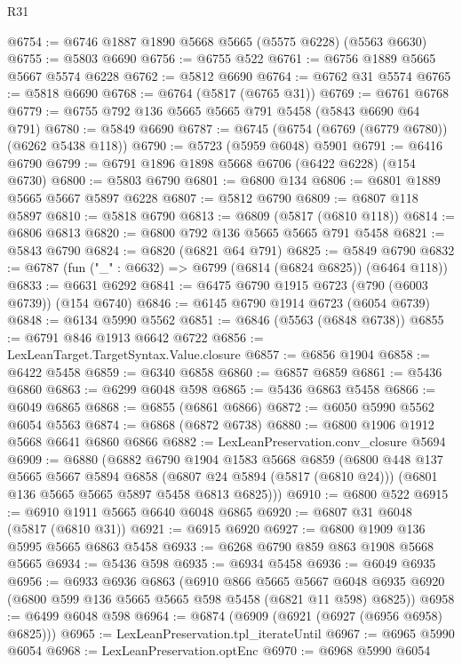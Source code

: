 \begin{lexlean}{R31}
\begin{coremodule}
@6754 := @6746 @1887 @1890 @5668 @5665 (@5575 @6228) (@5563 @6630)
@6755 := @5803 @6690
@6756 := @6755 @522
@6761 := @6756 @1889 @5665 @5667 @5574 @6228
@6762 := @5812 @6690
@6764 := @6762 @31 @5574
@6765 := @5818 @6690
@6768 := @6764 (@5817 (@6765 @31))
@6769 := @6761 @6768
@6779 := @6755 @792 @136 @5665 @5665 @791 @5458 (@5843 @6690 @64 @791)
@6780 := @5849 @6690
@6787 := @6745 (@6754 (@6769 (@6779 @6780)) (@6262 @5438 @118))
@6790 := @5723 (@5959 @6048) @5901
@6791 := @6416 @6790
@6799 := @6791 @1896 @1898 @5668 @6706 (@6422 @6228) (@154 @6730)
@6800 := @5803 @6790
@6801 := @6800 @134
@6806 := @6801 @1889 @5665 @5667 @5897 @6228
@6807 := @5812 @6790
@6809 := @6807 @118 @5897
@6810 := @5818 @6790
@6813 := @6809 (@5817 (@6810 @118))
@6814 := @6806 @6813
@6820 := @6800 @792 @136 @5665 @5665 @791 @5458
@6821 := @5843 @6790
@6824 := @6820 (@6821 @64 @791)
@6825 := @5849 @6790
@6832 := @6787 (fun ("_" : @6632) => @6799 (@6814 (@6824 @6825)) (@6464 @118))
@6833 := @6631 @6292
@6841 := @6475 @6790 @1915 @6723 (@790 (@6003 @6739)) (@154 @6740)
@6846 := @6145 @6790 @1914 @6723 (@6054 @6739)
@6848 := @6134 @5990 @5562
@6851 := @6846 (@5563 (@6848 @6738))
@6855 := @6791 @846 @1913 @6642 @6722
@6856 := LexLeanTarget.TargetSyntax.Value.closure
@6857 := @6856 @1904
@6858 := @6422 @5458
@6859 := @6340 @6858
@6860 := @6857 @6859
@6861 := @5436 @6860
@6863 := @6299 @6048 @598
@6865 := @5436 @6863 @5458
@6866 := @6049 @6865
@6868 := @6855 (@6861 @6866)
@6872 := @6050 @5990 @5562 @6054 @5563
@6874 := @6868 (@6872 @6738)
@6880 := @6800 @1906 @1912 @5668 @6641 @6860 @6866
@6882 := LexLeanPreservation.conv_closure @5694
@6909 := @6880
    (@6882
      @6790
      @1904
      @1583
      @5668
      @6859
      (@6800
        @448
        @137
        @5665
        @5667
        @5894
        @6858
        (@6807 @24 @5894 (@5817 (@6810 @24)))
        (@6801 @136 @5665 @5665 @5897 @5458 @6813 @6825)))
@6910 := @6800 @522
@6915 := @6910 @1911 @5665 @6640 @6048 @6865
@6920 := @6807 @31 @6048 (@5817 (@6810 @31))
@6921 := @6915 @6920
@6927 := @6800 @1909 @136 @5995 @5665 @6863 @5458
@6933 := @6268 @6790 @859 @863 @1908 @5668 @5665
@6934 := @5436 @598
@6935 := @6934 @5458
@6936 := @6049 @6935
@6956 := @6933
    @6936
    @6863
    (@6910
      @866
      @5665
      @5667
      @6048
      @6935
      @6920
      (@6800 @599 @136 @5665 @5665 @598 @5458 (@6821 @11 @598) @6825))
@6958 := @6499 @6048 @598
@6964 := @6874 (@6909 (@6921 (@6927 (@6956 @6958) @6825)))
@6965 := LexLeanPreservation.tpl_iterateUntil
@6967 := @6965 @5990 @6054
@6968 := LexLeanPreservation.optEnc
@6970 := @6968 @5990 @6054

\end{coremodule}
\end{lexlean}
